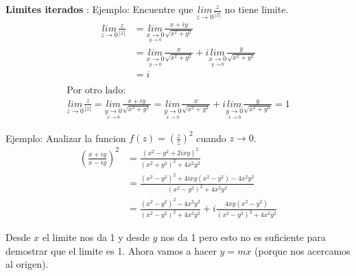 \documentclass{article}
\begin{document}
\textbf{Limites iterados }: Ejemplo: Encuentre que $ \underset{z  \rightarrow 0 }{lim}\displaystyle\frac{z }{\left|z \right|} $ no tiene limite.
\begin{align*}
  \underset{z  \rightarrow 0 }{lim}\displaystyle\frac{z }{\left|z \right|} &= \underset{\underset{y \rightarrow 0 }{x \rightarrow 0 }}{lim}\frac{x + i y }{\sqrt{x ^2 + y ^2} } \\
                                                                           &= \underset{\underset{y \rightarrow 0 }{x \rightarrow 0 }}{lim} \frac{x }{\sqrt{x ^2 + y ^2} } + i \underset{\underset{y \rightarrow 0 }{x \rightarrow 0 }}{lim} \frac{y }{\sqrt{x ^2+ y ^2} }\\
                                                                           &= i\\
\end{align*}
\begin{gather*}
                                                                           \text{Por otro lado: }\\
                                                                           \underset{z  \rightarrow 0 }{lim}\frac{z }{\left|z \right|} = \underset{\underset{x \rightarrow 0 }{y \rightarrow 0 }}{lim} \frac{x + i y }{\sqrt{x^2+y^2 } } = \underset{\underset{x \rightarrow 0 }{y \rightarrow 0 }}{lim} \frac{x }{\sqrt{x^2+y^2 } } + i \underset{\underset{x \rightarrow 0 }{y \rightarrow 0 }}{lim} \frac{y }{\sqrt{x^2+y^2 } } = 1
\end{gather*}

Ejemplo: Analizar la funcion $ f(z) = \left(\frac{z }{\bar z }\right)^2 $ cuando $ z \rightarrow 0  $.
\begin{align*}
  \left(\frac{x + i y }{x - i y }\right) ^2 &= \frac{(x ^2 - y ^2 + 2 ixy ) ^2}{(x ^2+ y ^2) ^2 + 4 x ^2 y ^2 }\\ 
    &= \frac{(x ^2- y ^2) ^2 + 4 ixy(x ^2- y ^2) - 4 x ^2y ^2}{(x ^2 - y ^2)^2 + 4 x ^2 y ^2 }\\
    &= \frac{(x ^2- y ^2)^2 - 4 x ^2y ^2 }{(x ^2 - y ^2)^2 + 4 x ^2 y ^2 } + i \frac{4xy(x ^2 - y ^2 )}{(x ^2 - y ^2)^2 + 4 x^2 y ^2}
\end{align*}

Desde $x$ el limite nos da 1 y desde $y$ nos da 1 pero esto no es suficiente para demostrar que el limite es 1. Ahora vamos a hacer $ y = mx  $ (porque nos acercamos al origen).
\end{document}
